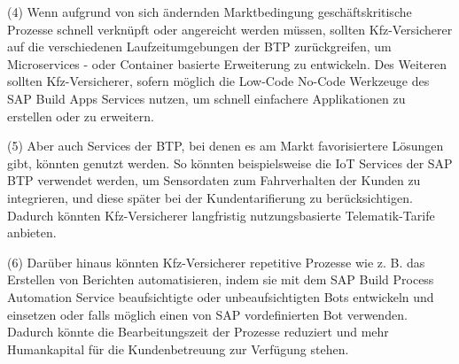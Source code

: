 (4) Wenn aufgrund von sich ändernden Marktbedingung geschäftskritische Prozesse schnell verknüpft oder angereicht werden müssen, sollten Kfz-Versicherer auf die verschiedenen Laufzeitumgebungen der BTP zurückgreifen, um Microservices - oder Container basierte Erweiterung zu entwickeln. Des Weiteren sollten Kfz-Versicherer, sofern möglich die Low-Code No-Code Werkzeuge des SAP Build Apps Services nutzen, um schnell einfachere Applikationen zu erstellen oder zu erweitern. 

(5) Aber auch Services der BTP, bei denen es am Markt favorisiertere Lösungen gibt, könnten genutzt werden. So könnten beispielsweise die IoT Services der SAP BTP verwendet werden, um Sensordaten zum Fahrverhalten der Kunden zu integrieren, und diese später bei der Kundentarifierung zu berücksichtigen. Dadurch könnten Kfz-Versicherer langfristig nutzungsbasierte Telematik-Tarife anbieten.

(6) Darüber hinaus könnten Kfz-Versicherer repetitive Prozesse wie z. B. das Erstellen von Berichten automatisieren, indem sie mit dem SAP Build Process Automation Service beaufsichtigte oder unbeaufsichtigten Bots entwickeln und einsetzen oder falls möglich einen von SAP vordefinierten Bot verwenden. Dadurch könnte die Bearbeitungszeit der Prozesse reduziert und mehr Humankapital für die Kundenbetreuung zur Verfügung stehen.


